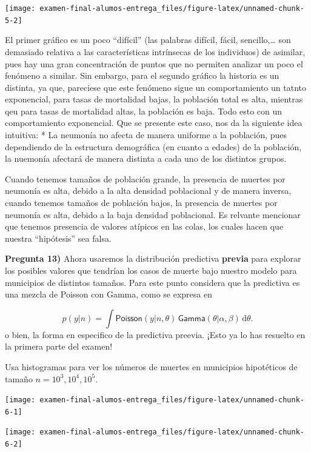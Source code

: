 \documentclass[
]{article}
\begin{document}
\begin{center}\texttt{[image: examen-final-alumos-entrega\_files/figure-latex/unnamed-chunk-5-2]} \end{center}

El primer gráfico es un poco ``difícil'' (las palabras difícil, fácil,
sencillo,\ldots{} son demasiado relativa a las características
intrínsecas de los individuos) de asimilar, pues hay una gran
concentración de puntos que no permiten analizar un poco el fenómeno a
similar. Sin embargo, para el segundo gráfico la historia es un
distinta, ya que, pareciese que este fenómeno sigue un comportamiento un
tatnto exponencial, para tasas de mortalidad bajas, la población total
es alta, mientras qeu para tasas de mortalidad altas, la población es
baja. Todo esto con un comportamiento exponencial. Que se presente este
caso, nos da la siguiente idea intuitiva: * La neumonía no afecta de
manera uniforme a la población, pues dependiendo de la estructura
demográfica (en cuanto a edades) de la población, la nuemonía afectará
de manera distinta a cada uno de los distintos grupos.

Cuando tenemos tamaños de población grande, la presencia de muertes por
neumonía es alta, debido a la alta densidad poblacional y de manera
inversa, cuando tenemos tamaños de población bajos, la presencia de
muertes por neumonía es alta, debido a la baja densidad poblacional. Es
relvante mencionar que tenemos presencia de valores atípicos en las
colas, los cuales hacen que nuestra ``hipótesis'' sea falsa.

\textbf{Pregunta 13)} Ahora usaremos la distribución predictiva
\textbf{previa} para explorar los posibles valores que tendrían los
casos de muerte bajo nuestro modelo para municipios de distintos
tamaños. Para este punto considera que la predictiva es una mezcla de
Poisson con Gamma, como se expresa en

\[p(y|n) = \int \textsf{Poisson}(y | n, \theta) \, \textsf{Gamma}(\theta|\alpha, \beta) \, \text{d}\theta.\]
o bien, la forma en especifico de la predictiva preevia. ¡Esto ya lo has
resuelto en la primera parte del examen!

Usa histogramas para ver los números de muertes en municipios
hipotéticos de tamaño \(n = 10^3, 10^4, 10^5.\)

\begin{center}\texttt{[image: examen-final-alumos-entrega\_files/figure-latex/unnamed-chunk-6-1]} \end{center}

\begin{center}\texttt{[image: examen-final-alumos-entrega\_files/figure-latex/unnamed-chunk-6-2]} \end{center}
\end{document}
